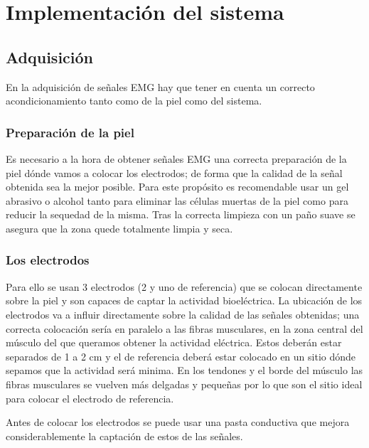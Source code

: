 \chapter{Implementación del sistema}\label{sec:Implementacion}

\section{Adquisición}


En la adquisición de señales EMG hay que tener en cuenta un correcto acondicionamiento tanto como de la piel como del sistema.


\subsection{Preparación de la piel} \label{sec:Preparaciondelapiel}
 Es necesario a la hora de obtener señales EMG una correcta preparación de la piel dónde vamos a colocar los electrodos; de forma que la calidad de la señal obtenida sea la mejor posible. Para este propósito es recomendable usar un gel abrasivo o alcohol tanto para eliminar las células muertas de la piel como para reducir la sequedad de la misma. Tras la correcta limpieza con un paño suave se asegura que la zona quede totalmente limpia y seca. \newline
\subsection{Los electrodos} \label{sec:Loselectrodos}

Para ello se usan 3 electrodos  (2 y uno de referencia) que se colocan directamente sobre la piel y son capaces de captar la actividad bioeléctrica. La ubicación de los electrodos va a influir directamente sobre la calidad de las señales obtenidas; una correcta colocación sería en paralelo a las fibras musculares, en la zona central del músculo del que queramos obtener la actividad eléctrica. Estos deberán estar separados de 1 a 2 cm y el de referencia deberá estar colocado en un sitio dónde sepamos que la actividad será minima. En los tendones y el borde del músculo las fibras musculares se vuelven más delgadas y pequeñas por lo que son el sitio ideal para colocar el electrodo de referencia. 

Antes de colocar los electrodos se puede usar una pasta conductiva que mejora considerablemente la captación de estos de las señales.\newline

